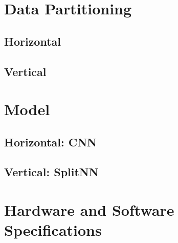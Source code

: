 \section{Data Partitioning}


\subsection{Horizontal}

\subsection{Vertical}

\section{Model}

\subsection{Horizontal: CNN}


\subsection{Vertical: SplitNN}

\section{Hardware and Software Specifications}

